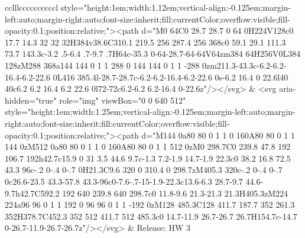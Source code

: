 \documentclass[
]{article}
\begin{document}
\begin{figure*}
\begin{longtable*}{cclllccccccccccl}
style="height:1em;width:1.12em;vertical-align:-0.125em;margin-left:auto;margin-right:auto;font-size:inherit;fill:currentColor;overflow:visible;fill-opacity:0.1;position:relative;"><path d="M0 64C0 28.7 28.7 0 64 0H224V128c0 17.7 14.3 32 32 32H384v38.6C310.1 219.5 256 287.4 256 368c0 59.1 29.1 111.3 73.7 143.3c-3.2 .5-6.4 .7-9.7 .7H64c-35.3 0-64-28.7-64-64V64zm384 64H256V0L384 128zM288 368a144 144 0 1 1 288 0 144 144 0 1 1 -288 0zm211.3-43.3c-6.2-6.2-16.4-6.2-22.6 0L416 385.4l-28.7-28.7c-6.2-6.2-16.4-6.2-22.6 0s-6.2 16.4 0 22.6l40 40c6.2 6.2 16.4 6.2 22.6 0l72-72c6.2-6.2 6.2-16.4 0-22.6z"/></svg> & <svg aria-hidden="true" role="img" viewBox="0 0 640 512" style="height:1em;width:1.25em;vertical-align:-0.125em;margin-left:auto;margin-right:auto;font-size:inherit;fill:currentColor;overflow:visible;fill-opacity:0.1;position:relative;"><path d="M144 0a80 80 0 1 1 0 160A80 80 0 1 1 144 0zM512 0a80 80 0 1 1 0 160A80 80 0 1 1 512 0zM0 298.7C0 239.8 47.8 192 106.7 192h42.7c15.9 0 31 3.5 44.6 9.7c-1.3 7.2-1.9 14.7-1.9 22.3c0 38.2 16.8 72.5 43.3 96c-.2 0-.4 0-.7 0H21.3C9.6 320 0 310.4 0 298.7zM405.3 320c-.2 0-.4 0-.7 0c26.6-23.5 43.3-57.8 43.3-96c0-7.6-.7-15-1.9-22.3c13.6-6.3 28.7-9.7 44.6-9.7h42.7C592.2 192 640 239.8 640 298.7c0 11.8-9.6 21.3-21.3 21.3H405.3zM224 224a96 96 0 1 1 192 0 96 96 0 1 1 -192 0zM128 485.3C128 411.7 187.7 352 261.3 352H378.7C452.3 352 512 411.7 512 485.3c0 14.7-11.9 26.7-26.7 26.7H154.7c-14.7 0-26.7-11.9-26.7-26.7z"/></svg> & Release: HW 3 \\ 

\end{longtable*}
\end{figure*}
\end{document}
